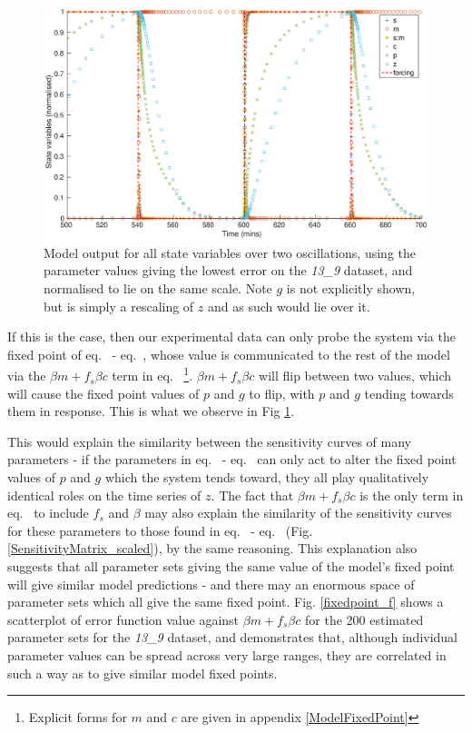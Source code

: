 \documentclass[10pt,journal]{./IEEE_latex_class/IEEEtran}
\renewcommand{\eqref}{eq.~\originaleqref}
\begin{document}
\begin{figure}[h]	
    \centering
        \includegraphics[scale = 0.23,clip = true, trim = 95 0 60 0]{model_output}
        \caption{Model output for all state variables over two oscillations, using the parameter values giving the lowest error on the \textit{13\_9} dataset, and normalised to lie on the same scale. Note $g$ is not explicitly shown, but is simply a rescaling of $z$ and as such would lie over it. }
        \label{model_output} 
\end{figure}

If this is the case, then our experimental data can only probe the system via the fixed point of \eqref{eq:s} - \eqref{eq:c}, whose value is communicated to the rest of the model via the $\beta m +f_{s}\beta c$ term in \eqref{eq:p} \footnote{ Explicit forms for $m$ and $c$ are given in appendix \ref{ModelFixedPoint}}. $\beta m +f_{s}\beta c$ will flip between two values, which will cause the fixed point values of $p$ and $g$ to flip, with $p$ and $g$ tending towards them in response. This is what we observe in Fig \ref{model_output}.

This would explain the similarity between the sensitivity curves of many parameters - if the parameters in \eqref{eq:s} - \eqref{eq:c} can only act to alter the fixed point values of $p$ and $g$ which the system tends toward, they all play qualitatively identical roles on the time series of $z$. The fact that $\beta m +f_{s}\beta c$ is the only term in \eqref{eq:p} to include $f_{s}$ and $\beta$ may also explain the similarity of the sensitivity curves for these parameters to those found in \eqref{eq:s} - \eqref{eq:c} (Fig. \ref{SensitivityMatrix_scaled}), by the same reasoning. This explanation also suggests that all parameter sets giving the same value of the model's fixed point will give similar model predictions - and there may an enormous space of parameter sets which all give the same fixed point. Fig. \ref{fixedpoint_f} shows a scatterplot of error function value against $\beta m +f_{s}\beta c$ for the 200 estimated parameter sets for the \textit{13\_9} dataset, and demonstrates that, although individual parameter values can be spread across very large ranges, they are correlated in such a way as to give similar model fixed points. 
\end{document}
